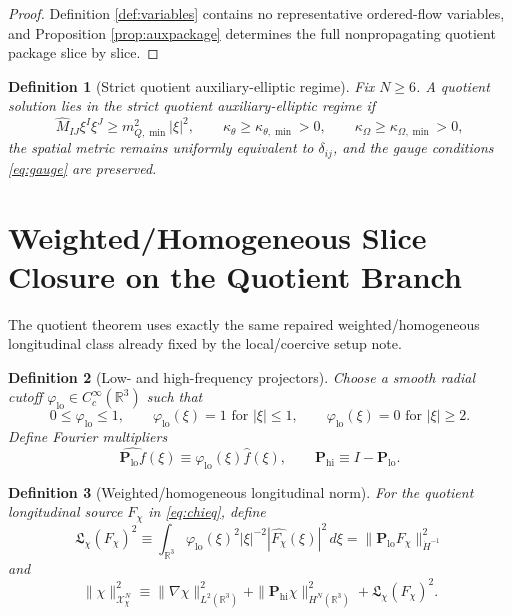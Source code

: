 \documentclass[11pt]{article}
\newtheorem{definition}{Definition}
\begin{document}
\begin{proof}
Definition \ref{def:variables} contains no representative ordered-flow variables, and Proposition \ref{prop:auxpackage} determines the full nonpropagating quotient package slice by slice.
\end{proof}

\begin{definition}[Strict quotient auxiliary-elliptic regime]
\label{def:strict}
Fix \(N\ge 6\). A quotient solution lies in the \emph{strict quotient auxiliary-elliptic regime} if
\begin{equation}
\widehat M_{IJ}\xi^I\xi^J\ge m_{Q,\min}^2|\xi|^2,
\qquad
\kappa_\theta\ge \kappa_{\theta,\min}>0,
\qquad
\kappa_\Omega\ge \kappa_{\Omega,\min}>0,
\label{eq:strict}
\end{equation}
the spatial metric remains uniformly equivalent to \(\delta_{ij}\), and the gauge conditions \eqref{eq:gauge} are preserved.
\end{definition}

\section{Weighted/Homogeneous Slice Closure on the Quotient Branch}

The quotient theorem uses exactly the same repaired weighted/homogeneous longitudinal class already fixed by the local/coercive setup note.

\begin{definition}[Low- and high-frequency projectors]
\label{def:projectors}
Choose a smooth radial cutoff \(\varphi_{\mathrm{lo}}\in C_c^\infty(\mathbb R^3)\) such that
\[
0\le \varphi_{\mathrm{lo}}\le 1,
\qquad
\varphi_{\mathrm{lo}}(\xi)=1 \text{ for } |\xi|\le 1,
\qquad
\varphi_{\mathrm{lo}}(\xi)=0 \text{ for } |\xi|\ge 2.
\]
Define Fourier multipliers
\begin{equation}
\widehat{\mathbf P_{\mathrm{lo}}f}(\xi)
\equiv
\varphi_{\mathrm{lo}}(\xi)\widehat f(\xi),
\qquad
\mathbf P_{\mathrm{hi}}\equiv I-\mathbf P_{\mathrm{lo}}.
\label{eq:projectors}
\end{equation}
\end{definition}

\begin{definition}[Weighted/homogeneous longitudinal norm]
\label{def:Xchi}
For the quotient longitudinal source \(F_\chi\) in \eqref{eq:chieq}, define
\begin{equation}
\mathfrak L_\chi(F_\chi)^2
\equiv
\int_{\mathbb R^3}
\varphi_{\mathrm{lo}}(\xi)^2
|\xi|^{-2}
|\widehat{F_\chi}(\xi)|^2\,d\xi
=
\|\mathbf P_{\mathrm{lo}}F_\chi\|_{\dot H^{-1}}^2
\label{eq:Lchi}
\end{equation}
and
\begin{equation}
\|\chi\|_{\mathcal X_\chi^N}^2
\equiv
\|\nabla\chi\|_{L^2(\mathbb R^3)}^2
+\|\mathbf P_{\mathrm{hi}}\chi\|_{H^N(\mathbb R^3)}^2
+\mathfrak L_\chi(F_\chi)^2.
\label{eq:Xchi}
\end{equation}
\end{definition}
\end{document}
